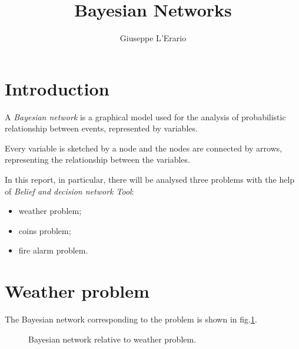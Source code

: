 \documentclass[10pt,a4paper]{article}
\author{Giuseppe L'Erario}
\date{}
\title{Bayesian Networks}
\begin{document}
	\maketitle
	
\section*{Introduction}
A \emph{Bayesian network} is a graphical model used for the analysis of probabilistic relationship between events, represented by variables.

Every variable is sketched by a node and the nodes are connected by arrows, representing the relationship between the variables.

In this report, in particular, there will be analysed three problems with the help of \emph{Belief and decision network Tool}:
\begin{itemize}
	\item weather problem;
	\item coins problem;
	\item fire alarm problem.
\end{itemize}

\section{Weather problem}

The Bayesian network corresponding to the problem is shown in fig.\ref{weather_prob}.

\begin{figure}[h]
	\centering
	\qquad
	\caption{Bayesian network relative to weather problem.\label{weather_prob}}
\end{figure}
\end{document}
